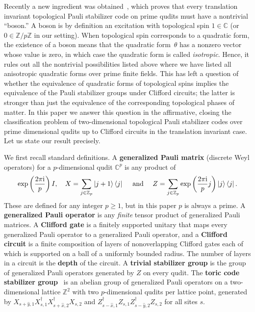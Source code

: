 \documentclass[aps,pra,
floatfix,notitlepage,
nofootinbib,
longbibliography,11pt]{revtex4-1}
\theoremstyle{definition}
\newcommand{\CC}{{\mathbb{C}}}
\newcommand{\ZZ}{{\mathbb{Z}}}
\newcommand{\imag}{\mathrm{i}}
\begin{document}
Recently a new ingredient was obtained~\cite{HFH2018},
which proves that every translation invariant topological Pauli stabilizer code on prime qudits
must have a nontrivial ``boson.''
A boson is by definition an excitation with topological spin $1 \in \CC$
(or $0 \in \ZZ/p\ZZ$ in our setting).
When topological spin corresponds to a quadratic form,
the existence of a boson means that the quadratic form~$\theta$ 
has a nonzero vector whose value is zero,
in which case the quadratic form is called \emph{isotropic}.
Hence, it rules out all the nontrivial possibilities listed above
where we have listed all anisotropic quadratic forms over prime finite fields.
This has left a question of whether the equivalence of quadratic forms of topological spins
implies the equivalence of the Pauli stabilizer groups under Clifford circuits;
the latter is stronger than just the equivalence of the corresponding topological phases of matter.
In this paper we answer this question in the affirmative,
closing the classification problem of two-dimensional topological Pauli stabilizer codes
over prime dimensional qudits up to Clifford circuits in the translation invariant case.
Let us state our result precisely.


We first recall standard definitions.
A {\bf generalized Pauli matrix} (discrete Weyl operators)
for a $p$-dimensional qudit $\CC^p$ is any product of
\begin{align}
\exp\left(\frac{2\pi \imag}{p}\right) I, \quad
X = \sum_{j \in \ZZ_p} \ket{j +1}\bra{j} \quad\text{ and }\quad 
Z = \sum_{j \in \ZZ_p} \exp\left(\frac{2\pi \imag}{p} j \right)\ket j \bra j .
\end{align}
These are defined for any integer $p \ge 1$,
but in this paper $p$ is always a prime.
A {\bf generalized Pauli operator} is any \emph{finite} tensor product of generalized Pauli matrices.
A {\bf Clifford gate} is a finitely supported unitary 
that maps every generalized Pauli operator to a generalized Pauli operator,
and a {\bf Clifford circuit} is a finite composition of layers of nonoverlapping Clifford gates
each of which is supported on a ball of a uniformly bounded radius.
The number of layers in a circuit is the {\bf depth} of the circuit.
A {\bf trivial stabilizer group} is the group of generalized Pauli operators
generated by $Z$ on every qudit.
The {\bf toric code stabilizer group}~\cite{Kitaev_2003}
is an abelian group of generalized Pauli operators
on a two-dimensional lattice $\ZZ^2$ with two $p$-dimensional qudits per lattice point,
generated by $X_{s+\hat y,1} X_{s,1}^\dagger X_{s+\hat x,2}^\dagger X_{s,2}$
and $Z_{s-\hat x,1}^\dagger Z_{s,1} Z_{s-\hat y,2}^\dagger Z_{s,2}$
for all sites $s$.
\end{document}
